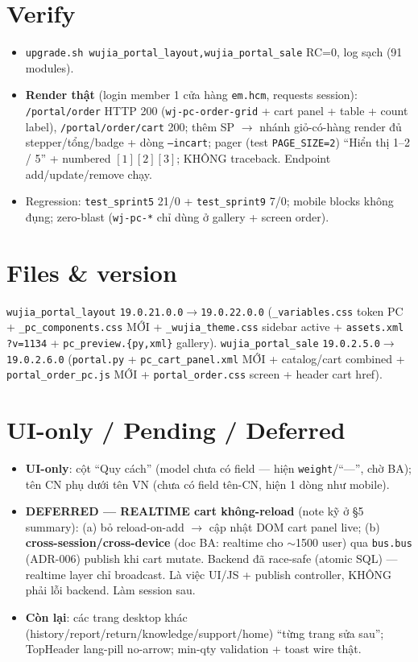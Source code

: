 \section{Verify}

\begin{itemize}
  \item \texttt{upgrade.sh wujia\_portal\_layout,wujia\_portal\_sale} RC=0, log sạch (91 modules).
  \item \textbf{Render thật} (login member 1 cửa hàng \texttt{em.hcm}, requests session):
        \texttt{/portal/order} HTTP 200 (\texttt{wj-pc-order-grid} + cart panel + table + count label),
        \texttt{/portal/order/cart} 200; thêm SP \(\rightarrow\) nhánh giỏ-có-hàng render đủ
        stepper/tổng/badge + dòng \texttt{--incart}; pager (test \texttt{PAGE\_SIZE=2}) ``Hiển thị 1--2 / 5'' +
        numbered \([1][2][3]\); KHÔNG traceback. Endpoint add/update/remove chạy.
  \item Regression: \texttt{test\_sprint5} 21/0 + \texttt{test\_sprint9} 7/0; mobile blocks không đụng;
        zero-blast (\texttt{wj-pc-*} chỉ dùng ở gallery + screen order).
\end{itemize}

\section{Files \& version}

\texttt{wujia\_portal\_layout} \texttt{19.0.21.0.0}\(\rightarrow\)\texttt{19.0.22.0.0} (\texttt{\_variables.css}
token PC + \texttt{\_pc\_components.css} MỚI + \texttt{\_wujia\_theme.css} sidebar active +
\texttt{assets.xml} \texttt{?v=1134} + \texttt{pc\_preview.\{py,xml\}} gallery).
\texttt{wujia\_portal\_sale} \texttt{19.0.2.5.0}\(\rightarrow\)\texttt{19.0.2.6.0} (\texttt{portal.py} +
\texttt{pc\_cart\_panel.xml} MỚI + catalog/cart combined + \texttt{portal\_order\_pc.js} MỚI +
\texttt{portal\_order.css} screen + header cart href).

\section{UI-only / Pending / Deferred}

\begin{itemize}
  \item \textbf{UI-only}: cột ``Quy cách'' (model chưa có field --- hiện \texttt{weight}/``---'', chờ BA);
        tên CN phụ dưới tên VN (chưa có field tên-CN, hiện 1 dòng như mobile).
  \item \textbf{DEFERRED --- REALTIME cart không-reload} (note kỹ ở \S5 summary): (a) bỏ reload-on-add
        \(\rightarrow\) cập nhật DOM cart panel live; (b) \textbf{cross-session/cross-device} (doc BA:
        realtime cho \(\sim\)1500 user) qua \texttt{bus.bus} (ADR-006) publish khi cart mutate. Backend
        đã race-safe (atomic SQL) --- realtime layer chỉ broadcast. Là việc UI/JS + publish controller,
        KHÔNG phải lỗi backend. Làm session sau.
  \item \textbf{Còn lại}: các trang desktop khác (history/report/return/knowledge/support/home) ``từng
        trang sửa sau''; TopHeader lang-pill no-arrow; min-qty validation + toast wire thật.
\end{itemize}
